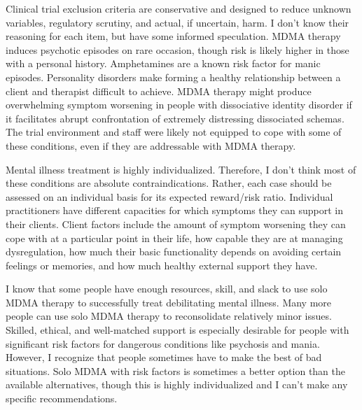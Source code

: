 \documentclass[11pt,oneside]{book}
\begin{document}
Clinical trial exclusion criteria are conservative and designed to reduce unknown variables, regulatory scrutiny, and actual, if uncertain, harm. I don't know their reasoning for each item, but have some informed speculation. MDMA therapy induces psychotic episodes on rare occasion, though risk is likely higher in those with a personal history. Amphetamines are a known risk factor for manic episodes. Personality disorders make forming a healthy relationship between a client and therapist difficult to achieve. MDMA therapy might produce overwhelming symptom worsening in people with dissociative identity disorder if it facilitates abrupt confrontation of extremely distressing dissociated schemas. The trial environment and staff were likely not equipped to cope with some of these conditions, even if they are addressable with MDMA therapy.

Mental illness treatment is highly individualized. Therefore, I don't think most of these conditions are absolute contraindications. Rather, each case should be assessed on an individual basis for its expected reward/risk ratio. Individual practitioners have different capacities for which symptoms they can support in their clients. Client factors include the amount of symptom worsening they can cope with at a particular point in their life, how capable they are at managing dysregulation, how much their basic functionality depends on avoiding certain feelings or memories, and how much healthy external support they have.

I know that some people have enough resources, skill, and slack to use solo MDMA therapy to successfully treat debilitating mental illness. Many more people can use solo MDMA therapy to reconsolidate relatively minor issues. Skilled, ethical, and well-matched support is especially desirable for people with significant risk factors for dangerous conditions like psychosis and mania. However, I recognize that people sometimes have to make the best of bad situations. Solo MDMA with risk factors is sometimes a better option than the available alternatives, though this is highly individualized and I can't make any specific recommendations.
\end{document}
